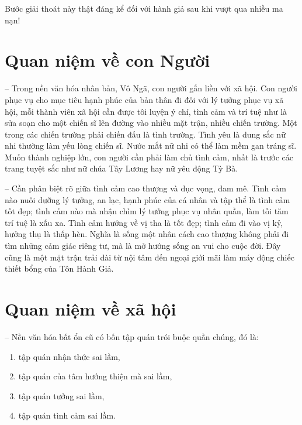 Bước giải thoát này thật đáng kể đối với hành giả sau khi vượt qua nhiều ma nạn!

\section{Quan niệm về con Người} %
\label{sec:53_54_con_nguoi}

-- Trong nền văn hóa nhân bản, Vô Ngã, con người gắn liền với xã hội. Con người phục vụ cho mục tiêu hạnh phúc của bản thân đi đôi với lý tưởng phục vụ xã hội, mỗi thành viên xã hội cần được tôi luyện ý chí, tình cảm và trí tuệ như là sửa soạn cho một chiến sĩ lên đường vào nhiều mặt trận, nhiều chiến trường. Một trong các chiến trường phải chiến đấu là tình trường. Tình yêu là dung sắc nữ nhi thường làm yếu lòng chiến sĩ. Nước mắt nữ nhi có thể làm mềm gan tráng sĩ. Muốn thành nghiệp lớn, con người cần phải làm chủ tình cảm, nhất là trước các trang tuyệt sắc như nữ chúa Tây Lương hay nữ yêu động Tỳ Bà.

-- Cần phân biệt rõ giữa tình cảm cao thượng và dục vọng, đam mê. Tình cảm nào nuôi dưỡng lý tưởng, an lạc, hạnh phúc của cá nhân và tập thể là tình cảm tốt đẹp; tình cảm nào mà nhận chìm lý tưởng phục vụ nhân quần, làm tối tăm trí tuệ là xấu xa. Tình cảm hướng về vị tha là tốt đẹp; tình cảm đi vào vị kỷ, hưởng thụ là thấp hèn. Nghĩa là sống một nhân cách cao thượng không phải đi tìm những cảm giác riêng tư, mà là mở hướng sống an vui cho cuộc đời. Đây cũng là một mặt trận trải dài từ nội tâm đến ngoại giới mãi làm máy động chiếc thiết bổng của Tôn Hành Giả.

\section{Quan niệm về xã hội} %
\label{sec:53_54_xa_hoi}

-- Nền văn hóa bất ổn cũ có bốn tập quán trói buộc quần chúng, đó là:

\begin{enumerate}[label=\itshape\arabic*\upshape/]
    \item tập quán nhận thức sai lầm,

    \item tập quán của tâm hướng thiện mà sai lầm,

    \item tập quán tưởng sai lầm,

    \item tập quán tình cảm sai lầm.
\end{enumerate}

